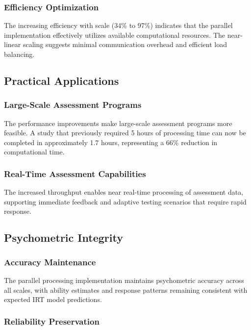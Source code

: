 \documentclass[11pt]{article}
\begin{document}
\subsubsection{Efficiency Optimization}

The increasing efficiency with scale (34\% to 97\%) indicates that the parallel implementation effectively utilizes available computational resources. The near-linear scaling suggests minimal communication overhead and efficient load balancing.

\subsection{Practical Applications}

\subsubsection{Large-Scale Assessment Programs}

The performance improvements make large-scale assessment programs more feasible. A study that previously required 5 hours of processing time can now be completed in approximately 1.7 hours, representing a 66\% reduction in computational time.

\subsubsection{Real-Time Assessment Capabilities}

The increased throughput enables near real-time processing of assessment data, supporting immediate feedback and adaptive testing scenarios that require rapid response.

\subsection{Psychometric Integrity}

\subsubsection{Accuracy Maintenance}

The parallel processing implementation maintains psychometric accuracy across all scales, with ability estimates and response patterns remaining consistent with expected IRT model predictions.

\subsubsection{Reliability Preservation}
\end{document}
